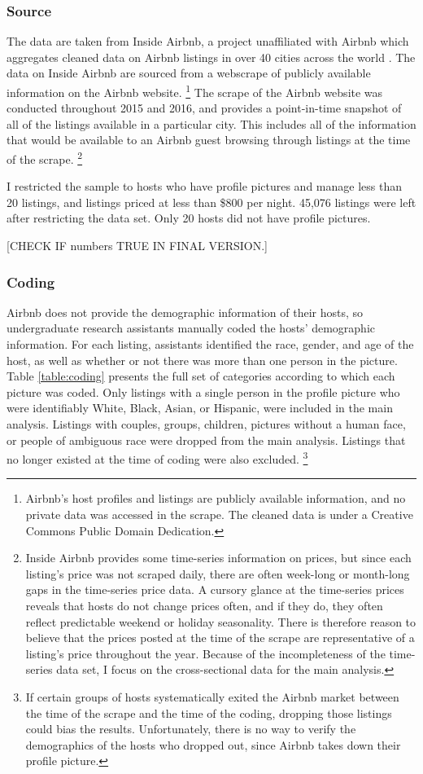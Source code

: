 \subsubsection*{Source} 
The data are taken from Inside Airbnb, a project unaffiliated with Airbnb which aggregates cleaned data on Airbnb listings in over 40 cities across the world \citep{insideairbnb}. The data on Inside Airbnb are sourced from a webscrape of publicly available information on the Airbnb website.%
	\footnote{Airbnb's host profiles and listings are publicly available information, and no private data was accessed in the scrape. The cleaned data is under a Creative Commons Public Domain Dedication.} 
The scrape of the Airbnb website was conducted throughout 2015 and 2016, and provides a point-in-time snapshot of all of the listings available in a particular city. This includes all of the information that would be available to an Airbnb guest browsing through listings at the time of the scrape.%
	\footnote{Inside Airbnb provides some time-series information on prices, but since each listing's price was not scraped daily, there are often week-long or month-long gaps in the time-series price data. A cursory glance at the time-series prices reveals that hosts do not change prices often, and if they do, they often reflect predictable weekend or holiday seasonality. There is therefore reason to believe that the prices posted at the time of the scrape are representative of a listing's price throughout the year. Because of the incompleteness of the time-series data set, I focus on the cross-sectional data for the main analysis.} 

I restricted the sample to hosts who have profile pictures and manage less than 20 listings, and listings priced at less than \$800 per night. 45,076 listings were left after restricting the data set. Only 20 hosts did not have profile pictures. 

[CHECK IF numbers TRUE IN FINAL VERSION.]

\subsubsection*{Coding} 
Airbnb does not provide the demographic information of their hosts, so undergraduate research assistants manually coded the hosts' demographic information. For each listing, assistants identified the race, gender, and age of the host, as well as whether or not there was more than one person in the picture. Table \ref{table:coding} presents the full set of categories according to which each picture was coded. Only listings with a single person in the profile picture who were identifiably White, Black, Asian, or Hispanic, were included in the main analysis. Listings with couples, groups, children, pictures without a human face, or people of ambiguous race were dropped from the main analysis. Listings that no longer existed at the time of coding were also excluded.%
	\footnote{If certain groups of hosts systematically exited the Airbnb market between the time of the scrape and the time of the coding, dropping those listings could bias the results. Unfortunately, there is no way to verify the demographics of the hosts who dropped out, since Airbnb takes down their profile picture.}

